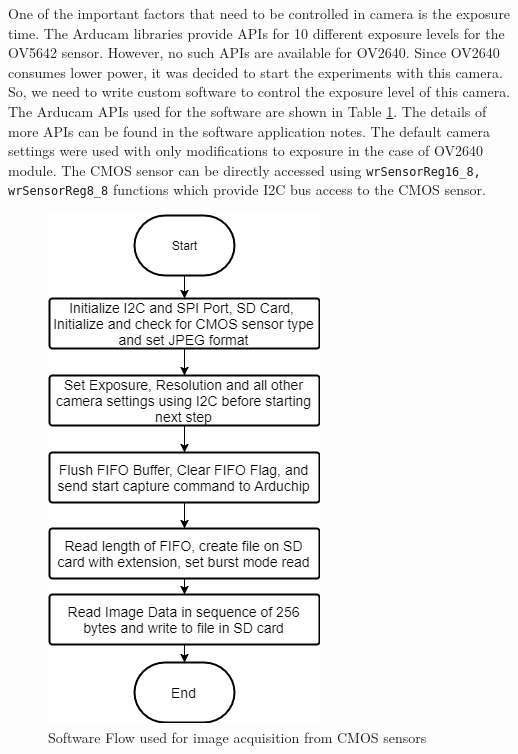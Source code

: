 One of the important factors that need to be controlled in camera is the exposure time. The Arducam libraries provide APIs for 10 different exposure levels for the OV5642 sensor. However, no such APIs are available for OV2640. Since OV2640 consumes lower power, it was decided to start the experiments with this camera. So, we need to write custom software to control the exposure level of this camera. The Arducam APIs used for the software are shown in Table \ref{fig:arducam_software}. The details of more APIs can be found in the software application notes\cite{ArducamSoftwareApp}. The default camera settings were used with only modifications to exposure in the case of OV2640 module. The CMOS sensor can be directly accessed using \texttt{wrSensorReg16\_8, wrSensorReg8\_8} functions which provide I2C bus access to the CMOS sensor.
\begin{figure}[!htbp]
\centering
\includegraphics[scale  = 0.5]{pics/SoftwareFlowOV2640}
\caption{Software Flow used for image acquisition from CMOS sensors}
\label{fig:arducam_software}
\end{figure}



